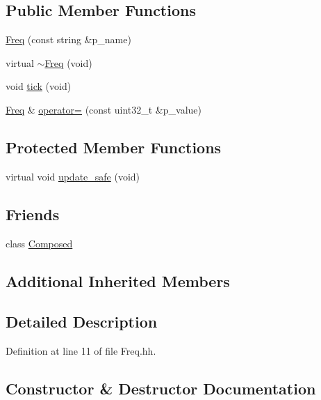 \subsection*{Public Member Functions}
\begin{DoxyCompactItemize}
\item 
\hyperlink{classxtd_1_1counters_1_1Freq_ac48f859e66bef29a24a2cd9e2ad2aff6}{Freq} (const string \&p\+\_\+name)
\item 
virtual \hyperlink{classxtd_1_1counters_1_1Freq_ac5d39dc4ea5211f48bf6f4834fe2558b}{$\sim$\+Freq} (void)
\item 
void \hyperlink{classxtd_1_1counters_1_1Freq_a9e91ea45fc5e9874dc81ca4bd723efc6}{tick} (void)
\item 
\hyperlink{classxtd_1_1counters_1_1Freq}{Freq} \& \hyperlink{classxtd_1_1counters_1_1Freq_a622e28502b8613bbac6fd40f324ddb8c}{operator=} (const uint32\+\_\+t \&p\+\_\+value)
\end{DoxyCompactItemize}
\subsection*{Protected Member Functions}
\begin{DoxyCompactItemize}
\item 
virtual void \hyperlink{classxtd_1_1counters_1_1Freq_af4ee512e594def96c8bd907d2a369729}{update\+\_\+safe} (void)
\end{DoxyCompactItemize}
\subsection*{Friends}
\begin{DoxyCompactItemize}
\item 
class \hyperlink{classxtd_1_1counters_1_1Freq_a93e934ad70d5b32b14beed5572450abf}{Composed}
\end{DoxyCompactItemize}
\subsection*{Additional Inherited Members}


\subsection{Detailed Description}


Definition at line 11 of file Freq.\+hh.



\subsection{Constructor \& Destructor Documentation}
